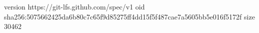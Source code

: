 version https://git-lfs.github.com/spec/v1
oid sha256:5075662425da6b80c7c65f9d85275ff4dd15f5f487cae7a5605bb5e016f5172f
size 30462
